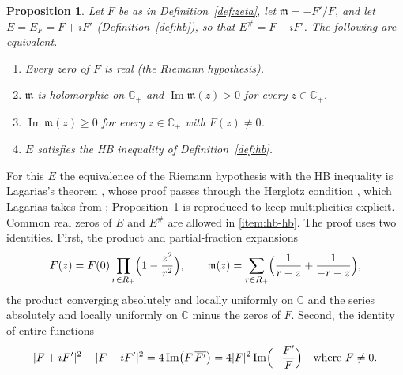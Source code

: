 \documentclass[11pt]{amsart}
\theoremstyle{plain}
\newtheorem{proposition}[theorem]{Proposition}
\theoremstyle{definition}
\theoremstyle{remark}
\numberwithin{equation}{section}
\newcommand{\C}{\mathbb{C}}
\newcommand{\Cp}{\mathbb{C}_{+}}
\DeclareMathOperator{\Ima}{Im}
\renewcommand{\Im}{\Ima}
\begin{document}
\begin{proposition}\label{prop:hb}
Let $F$ be as in Definition~\ref{def:zeta}, let $\mathfrak m=-F'/F$,
and let $E=E_F=F+iF'$ (Definition~\ref{def:hb}), so that
$E^\#=F-iF'$. The following are equivalent.
\begin{enumerate}[label=(\roman*)]
\item\label{item:hb-rh} Every zero of $F$ is real (the Riemann
  hypothesis).
\item\label{item:hb-herglotz} $\mathfrak m$ is holomorphic on $\Cp$
  and $\Im\mathfrak m(z)>0$ for every $z\in\Cp$.
\item\label{item:hb-weak} $\Im\mathfrak m(z)\ge0$ for every $z\in\Cp$
  with
  $F(z)\ne0$.
\item\label{item:hb-hb} $E$ satisfies the HB inequality of
  Definition~\ref{def:hb}.
\end{enumerate}
\end{proposition}

For this $E$ the equivalence of the Riemann hypothesis with the HB
inequality is Lagarias's theorem
\cite[Theorem~1, p.~9]{Lagarias2006HilbertEntire}, whose proof passes
through the Herglotz condition \cite[(10), p.~9]{Lagarias2006HilbertEntire},
which Lagarias takes from \cite{Lagarias1999Positivity};
Proposition~\ref{prop:hb} is reproduced
to keep multiplicities explicit.
Common real zeros of $E$ and $E^\#$ are allowed in \ref{item:hb-hb}.
The proof uses two identities. First, the product and partial-fraction
expansions
\begin{equation}\label{eq:hb-product}
F(z)=F(0)\prod_{r\in R_+}\Bigl(1-\frac{z^2}{r^2}\Bigr),\qquad
\mathfrak m(z)=\sum_{r\in R_+}\Bigl(\frac1{r-z}+\frac1{-r-z}\Bigr),
\end{equation}
the product converging absolutely and locally uniformly on $\C$ and the
series absolutely and locally uniformly on $\C$ minus the zeros of $F$.
Second, the identity of entire functions
\begin{equation}\label{eq:hb-modulus}
|F+iF'|^2-|F-iF'|^2=4\Im\bigl(F\,\overline{F'}\bigr)
=4|F|^2\Im\Bigl(-\frac{F'}{F}\Bigr)\quad\text{where }F\ne0.
\end{equation}
\end{document}
